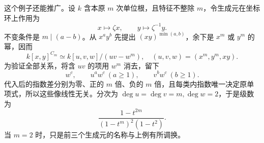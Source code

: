 \ProseParagraphBreak
这个例子还能推广。设 \(k\) 含本原 \(m\) 次单位根，且特征不整除 \(m\)，令生成元在坐标环上作用为
\[
	x\longmapsto\zeta x,\qquad y\longmapsto\zeta^{-1}y.
\]
不变条件是 \(m\mid(a-b)\)。从 \(x^ay^b\) 先提出 \((xy)^{\min(a,b)}\)，余下是 \(x^m\) 或 \(y^m\) 的幂，因而
\begin{equation}\label{b5:eq:cyclic-surface-presentation}
	k[x,y]^{C_m}\simeq k[u,v,w]/(uv-w^m), \quad (u,v,w)=(x^m,y^m,xy).
\end{equation}
为验证全部关系，将含 \(uv\) 的项用 \(w^m\) 消去，留下
\[
	w^c,\qquad u^aw^c\ (a\ge1),\qquad v^bw^c\ (b\ge1).
\]
代入后的指数差分别为零、正的 \(m\) 倍、负的 \(m\) 倍，且每类内指数唯一决定原单项式，所以这些像线性无关。分次为 \(\deg u=\deg v=m,\deg w=2\)，于是级数为
\[
	\frac{1-t^{2m}}{(1-t^m)^2(1-t^2)}.
\]
当 \(m=2\) 时，只是前三个生成元的名称与上例有所调换。
